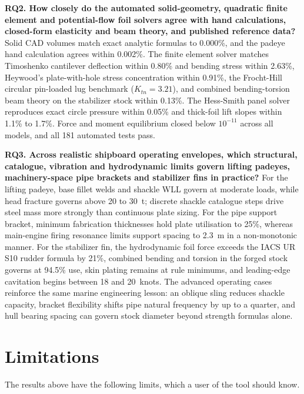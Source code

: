 \textbf{RQ2. How closely do the automated solid-geometry, quadratic finite
element and potential-flow foil solvers agree with hand calculations,
closed-form elasticity and beam theory, and published reference data?} Solid
CAD volumes match exact analytic formulas to 0.000\%, and the padeye hand
calculation agrees within 0.002\%. The finite element solver matches
Timoshenko cantilever deflection within 0.80\% and bending stress within
2.63\%, Heywood's plate-with-hole stress concentration within 0.91\%, the
Frocht-Hill circular pin-loaded lug benchmark ($K_{tn} = 3.21$), and
combined bending-torsion beam theory on the stabilizer stock within 0.13\%.
The Hess-Smith panel solver reproduces exact circle pressure within 0.05\%
and thick-foil lift slopes within 1.1\% to 1.7\%. Force and moment
equilibrium closed below $10^{-11}$ across all models, and all 181 automated
tests pass.

\textbf{RQ3. Across realistic shipboard operating envelopes, which structural,
catalogue, vibration and hydrodynamic limits govern lifting padeyes,
machinery-space pipe brackets and stabilizer fins in practice?} For the
lifting padeye, base fillet welds and shackle WLL govern at moderate loads,
while head fracture governs above 20 to 30~t; discrete shackle catalogue
steps drive steel mass more strongly than continuous plate sizing. For the
pipe support bracket, minimum fabrication thicknesses hold plate utilisation
to 25\%, whereas main-engine firing resonance limits support spacing to
2.3~m in a non-monotonic manner. For the stabilizer fin, the hydrodynamic
foil force exceeds the IACS UR S10 rudder formula by 21\%, combined bending
and torsion in the forged stock governs at 94.5\% use, skin plating remains
at rule minimums, and leading-edge cavitation begins between 18 and 20~knots.
The advanced operating cases reinforce the same marine engineering lesson: an
oblique sling reduces shackle capacity, bracket flexibility shifts pipe
natural frequency by up to a quarter, and hull bearing spacing can govern
stock diameter beyond strength formulas alone.

\section{Limitations}
\label{sec:limitations}

The results above have the following limits, which a user of the tool should
know.

